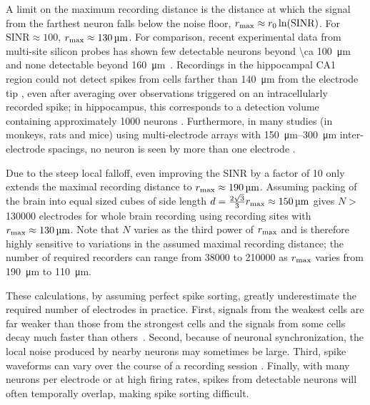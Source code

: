 A limit on the maximum recording distance is the distance at which the signal from the farthest neuron falls below the noise floor, $r_{\text{\scriptsize max}} \approx r_{\text{\scriptsize 0}}\ln(\text{SINR})$. For $\text{SINR} \approx 100$, $r_{\text{\scriptsize max}} \approx \SI{130}{\micro\meter}$. For comparison, recent experimental data from multi-site silicon probes has shown few detectable neurons beyond \SI{\ca 100}{\micro\meter} and none detectable beyond \SI{160}{\micro\meter}~\cite{du11}. 
Recordings in the hippocampal CA1 region could not detect spikes from cells farther than \SI{140}{\micro\meter} from the electrode tip \cite{Henze2000}, even after averaging over observations triggered on an intracellularly recorded spike; in hippocampus, this corresponds to a detection volume containing approximately 1000 neurons \cite{Buzaki2004}. Furthermore, in many studies (in monkeys, rats and mice) using multi-electrode arrays with \SIrange{150}{300}{\micro\meter} inter-electrode spacings, no neuron is seen by more than one electrode \cite{Wessberg2000, Carmena2003, Koralek2012, Jin2010}.

Due to the steep local falloff, even improving the SINR by a factor of 10 only extends the maximal recording distance to $r_{\text{\scriptsize max}} \approx \SI{190}{\micro\meter}$. Assuming packing of the brain into equal sized cubes of side length $d = \frac{2\sqrt{3}}{3}r_{\text{\scriptsize max}} \approx \SI{150}{\micro\meter}$ gives $N >$ \num{130000} electrodes for whole brain recording using recording sites with $r_{\text{\scriptsize max}} \approx \SI{130}{\micro\meter}$. Note that $N$ varies as the third power of $r_{\text{\scriptsize max}}$ and is therefore highly sensitive to variations in the assumed maximal recording distance; the number of required recorders can range from \num{38000} to \num{210000} as $r_{\text{\scriptsize max}}$ varies from \SI{190}{\micro\meter} to \SI{110}{\micro\meter}.

These calculations, by assuming perfect spike sorting, greatly underestimate the required number of electrodes in practice.
First, signals from the weakest cells are far weaker than those from the strongest cells and the signals from some cells decay much faster than others~\cite{gray95}.
Second, because of neuronal synchronization, the local noise produced by nearby neurons may sometimes be large.
Third, spike waveforms can vary over the course of a recording session \cite{fee1996variability, stratton2012action}.
Finally, with many neurons per electrode or at high firing rates, spikes from detectable neurons will often temporally overlap, making spike sorting difficult.

